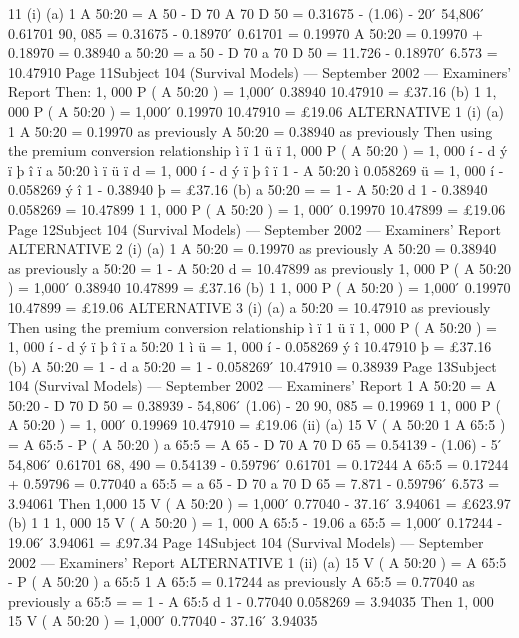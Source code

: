 \documentclass[a4paper,12pt]{article}
\begin{document}
\begin{enumerate}
11
(i)
(a)
1
A 50:20
= A 50 -
D 70
A 70
D 50
= 0.31675 - (1.06) - 20  ́
54,806
 ́ 0.61701
90, 085
= 0.31675 - 0.18970  ́ 0.61701
= 0.19970
A 50:20 = 0.19970 + 0.18970 = 0.38940
a 50:20 = a 50 -
D 70
a 70
D 50
= 11.726 - 0.18970  ́ 6.573
= 10.47910
Page 11Subject 104 (Survival Models) — September 2002 — Examiners’ Report
Then: 1, 000 P ( A 50:20 ) = 1,000  ́
0.38940
10.47910
= £37.16
(b)
1
1, 000 P ( A 50:20
) = 1,000  ́
0.19970
10.47910
= £19.06
ALTERNATIVE 1
(i)
(a)
1
A 50:20
= 0.19970 as previously
A 50:20 = 0.38940 as previously
Then using the premium conversion relationship
ì ï 1
ü ï
1, 000 P ( A 50:20 ) = 1, 000 í
- d ý
ï þ
î ï a 50:20
ì ï
ü ï
d
= 1, 000 í
- d ý
ï þ
î ï 1 - A 50:20
ì 0.058269
ü
= 1, 000 í
- 0.058269 ý
î 1 - 0.38940
þ
= £37.16
(b)
a 50:20 =
=
1 - A 50:20
d
1 - 0.38940
0.058269
= 10.47899
1
1, 000 P ( A 50:20
) =
1, 000  ́ 0.19970
10.47899
= £19.06
Page 12Subject 104 (Survival Models) — September 2002 — Examiners’ Report
ALTERNATIVE 2
(i)
(a)
1
A 50:20
= 0.19970 as previously
A 50:20 = 0.38940 as previously
a 50:20 =
1 - A 50:20
d
= 10.47899 as previously
1, 000 P ( A 50:20 ) = 1,000  ́
0.38940
10.47899
= £37.16
(b)
1
1, 000 P ( A 50:20
) = 1,000  ́
0.19970
10.47899
= £19.06
ALTERNATIVE 3
(i)
(a)
a 50:20 = 10.47910 as previously
Then using the premium conversion relationship
ì ï 1
ü ï
1, 000 P ( A 50:20 ) = 1, 000 í
- d ý
ï þ
î ï a 50:20
1
ì
ü
= 1, 000 í
- 0.058269 ý
î 10.47910
þ
= £37.16
(b)
A 50:20 = 1 - d a 50:20
= 1 - 0.058269  ́ 10.47910
= 0.38939
Page 13Subject 104 (Survival Models) — September 2002 — Examiners’ Report
1
A 50:20
= A 50:20 -
D 70
D 50
= 0.38939 -
54,806
 ́ (1.06) - 20
90, 085
= 0.19969
1
1, 000 P ( A 50:20
) =
1, 000  ́ 0.19969
10.47910
= £19.06
(ii)
(a)
15 V ( A 50:20
1
A 65:5
) = A 65:5 - P ( A 50:20 ) a 65:5
= A 65 -
D 70
A 70
D 65
= 0.54139 - (1.06) - 5  ́
54,806
 ́ 0.61701
68, 490
= 0.54139 - 0.59796  ́ 0.61701
= 0.17244
A 65:5 = 0.17244 + 0.59796 = 0.77040
a 65:5 = a 65 -
D 70
a 70
D 65
= 7.871 - 0.59796  ́ 6.573
= 3.94061
Then 1,000 15 V ( A 50:20 ) = 1,000  ́ 0.77040 - 37.16  ́ 3.94061
= £623.97
(b)
1
1
1, 000 15 V ( A 50:20
) = 1, 000 A 65:5
- 19.06 a 65:5
= 1,000  ́ 0.17244 - 19.06  ́ 3.94061
= £97.34
Page 14Subject 104 (Survival Models) — September 2002 — Examiners’ Report
ALTERNATIVE 1
(ii)
(a)
15 V ( A 50:20
) = A 65:5 - P ( A 50:20 ) a 65:5
1
A 65:5
= 0.17244 as previously
A 65:5 = 0.77040 as previously
a 65:5 =
=
1 - A 65:5
d
1 - 0.77040
0.058269
= 3.94035
Then 1, 000 15 V ( A 50:20 ) = 1,000  ́ 0.77040 - 37.16  ́ 3.94035

\end{enumerate}
\end{document}
